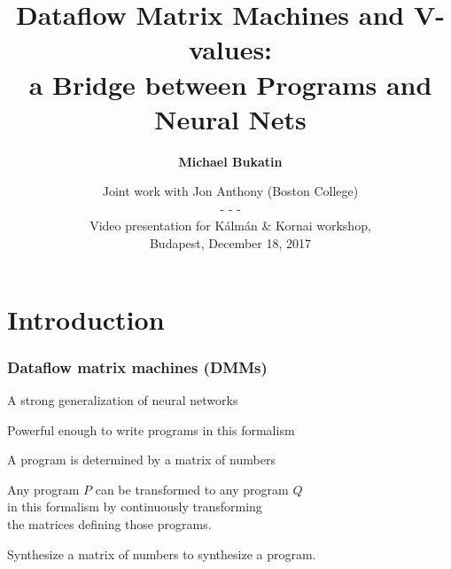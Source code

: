 \documentclass{beamer}
\newcommand{\msgray}[1]{{\color{mygray} #1}}
\begin{document}
\title{Dataflow Matrix Machines and V-values:\\ a Bridge between Programs and Neural Nets}
\author{\bf Michael Bukatin}
\date[]  
{\small Joint work with Jon Anthony (Boston College)\\
 - - -\\
{Video presentation for K\'alm\'an \& Kornai workshop,\\
Budapest, December 18, 2017}}

\begin{frame}
  \titlepage
\end{frame}



\section{Introduction}



\begin{frame}

\frametitle{Dataflow matrix machines (DMMs)}

\begin{itemize}

\item A strong generalization of neural networks\\[2ex]

\msgray{\item Powerful enough  to write programs in this formalism\\[2ex]

\item A program is determined by a matrix of numbers\\[2ex]

\item Any program $P$ can be transformed to any program $Q$\\ in this formalism
        by continuously transforming\\ the matrices defining those programs.\\[2ex]

\item Synthesize a matrix of numbers to synthesize a program.

}

\end{itemize}

\end{frame}
\end{document}
